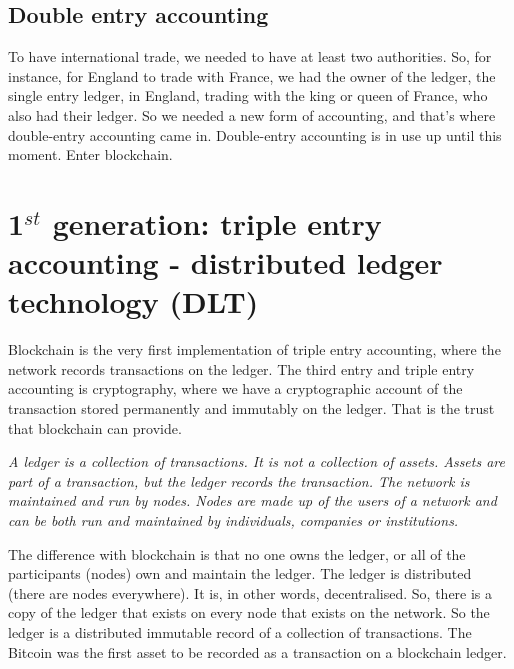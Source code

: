 \subsection{Double entry accounting}
To have international trade, we needed to have at least two authorities. So, for instance, for England to trade with France, we had the owner of the ledger, the single entry ledger, in England, trading with the king or queen of France, who also had their ledger. So we needed a new form of accounting, and that's where double-entry accounting came in. Double-entry accounting is in use up until this moment. Enter blockchain. 

\medskip 




\section{\texorpdfstring{1$^{st}$ generation: triple entry accounting - distributed ledger technology (DLT)}{1st generation: generation: triple entry accounting - distributed ledger technology (DLT)}}
Blockchain is the very first implementation of triple entry accounting, where the network records transactions on the ledger. The third entry and triple entry accounting is cryptography, where we have a cryptographic account of the transaction stored permanently and immutably on the ledger. That is the trust that blockchain can provide.

\medskip 
{}
    \begin{tcolorbox}
    [enhanced,
    title=Distributed Ledger Technology (DLT),
    frame style=
    {left color=orange!85!black,right color=yellow!95!black}]
        
           \textit{A ledger is a collection of transactions. It is not a collection of assets. Assets are part of a transaction, but the ledger records the transaction. The network is maintained and run by nodes. Nodes are made up of the users of a network and can be both run and maintained by individuals, companies or institutions.}
       
\end{tcolorbox}
\medskip

The difference with blockchain is that no one owns the ledger, or all of the participants (nodes) own and maintain the ledger. The ledger is distributed (there are nodes everywhere). It is, in other words, decentralised. So, there is a copy of the ledger that exists on every node that exists on the network. So the ledger is a distributed immutable record of a collection of transactions. The Bitcoin was the first asset to be recorded as a transaction on a blockchain ledger.


